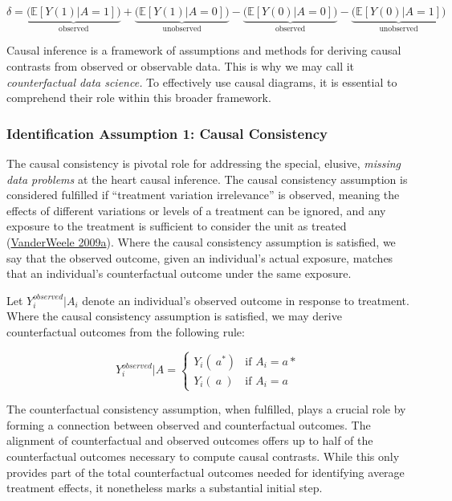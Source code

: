 \documentclass[
  singlecolumn]{article}
\begin{document}
\[
\delta = \underbrace{\big(\mathbb{E}[Y(1)|A = 1]\big)}_{\text{observed}} + \underbrace{\big(\mathbb{E}[Y(1)|A = 0]\big)}_{\text{unobserved}} - \underbrace{\big(\mathbb{E}[Y(0)|A = 0]\big)}_{\text{observed}}  - \underbrace{\big(\mathbb{E}[Y(0)|A = 1]\big)}_{\text{unobserved}}
\]

Causal inference is a framework of assumptions and methods for deriving
causal contrasts from observed or observable data. This is why we may
call it \emph{counterfactual data science.} To effectively use causal
diagrams, it is essential to comprehend their role within this broader
framework.

\hypertarget{identification-assumption-1-causal-consistency}{%
\subsubsection{Identification Assumption 1: Causal
Consistency}\label{identification-assumption-1-causal-consistency}}

The causal consistency is pivotal role for addressing the special,
elusive, \emph{missing data problems} at the heart causal inference. The
causal consistency assumption is considered fulfilled if ``treatment
variation irrelevance'' is observed, meaning the effects of different
variations or levels of a treatment can be ignored, and any exposure to
the treatment is sufficient to consider the unit as treated
(\protect\hyperlink{ref-vanderweele2009}{VanderWeele 2009a}). Where the
causal consistency assumption is satisfied, we say that the observed
outcome, given an individual's actual exposure, matches that an
individual's counterfactual outcome under the same exposure.

Let \(Y_i^{observed}|A_i\) denote an individual's observed outcome in
response to treatment. Where the causal consistency assumption is
satisfied, we may derive counterfactual outcomes from the following
rule:

\[
Y_i^{observed}|A = 
\begin{cases} 
Y_i(~a^*) & \text{if } A_i = a* \\
Y_i(~a~) & \text{if } A_i = a
\end{cases}
\]

The counterfactual consistency assumption, when fulfilled, plays a
crucial role by forming a connection between observed and counterfactual
outcomes. The alignment of counterfactual and observed outcomes offers
up to half of the counterfactual outcomes necessary to compute causal
contrasts. While this only provides part of the total counterfactual
outcomes needed for identifying average treatment effects, it
nonetheless marks a substantial initial step.
\end{document}
